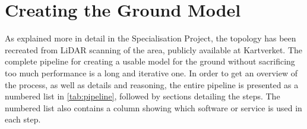 \section{Creating the Ground Model}
    As explained more in detail in the Specialisation Project\cite{specialisation}, the topology has been recreated from LiDAR scanning of the area, publicly available at Kartverket\cite{hoydedata}. The complete pipeline for creating a usable model for the ground without sacrificing too much performance is a long and iterative one. In order to get an overview of the process, as well as details and reasoning, the entire pipeline is presented as a numbered list in \cref{tab:pipeline}, followed by sections detailing the steps. The numbered list also contains a column showing which software or service is used in each step.
    
    \setcounter{rownumbers}{0}
    
